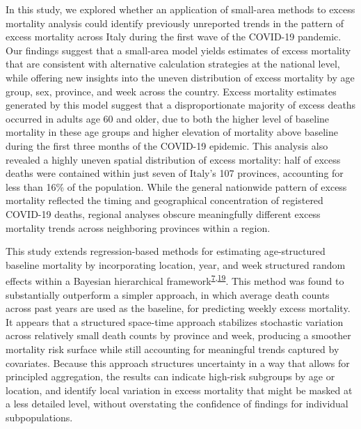 \documentclass[
]{article}
\begin{document}
In this study, we explored whether an application of small-area methods to excess mortality analysis could identify previously unreported trends in the pattern of excess mortality across Italy during the first wave of the COVID-19 pandemic. Our findings suggest that a small-area model yields estimates of excess mortality that are consistent with alternative calculation strategies at the national level, while offering new insights into the uneven distribution of excess mortality by age group, sex, province, and week across the country. Excess mortality estimates generated by this model suggest that a disproportionate majority of excess deaths occurred in adults age 60 and older, due to both the higher level of baseline mortality in these age groups and higher elevation of mortality above baseline during the first three months of the COVID-19 epidemic. This analysis also revealed a highly uneven spatial distribution of excess mortality: half of excess deaths were contained within just seven of Italy's 107 provinces, accounting for less than 16\% of the population. While the general nationwide pattern of excess mortality reflected the timing and geographical concentration of registered COVID-19 deaths, regional analyses obscure meaningfully different excess mortality trends across neighboring provinces within a region.

This study extends regression-based methods for estimating age-structured baseline mortality by incorporating location, year, and week structured random effects within a Bayesian hierarchical framework\textsuperscript{\protect\hyperlink{ref-Serfling1963}{7},\protect\hyperlink{ref-Ederer1961}{19}}⁠. This method was found to substantially outperform a simpler approach, in which average death counts across past years are used as the baseline, for predicting weekly excess mortality. It appears that a structured space-time approach stabilizes stochastic variation across relatively small death counts by province and week, producing a smoother mortality risk surface while still accounting for meaningful trends captured by covariates. Because this approach structures uncertainty in a way that allows for principled aggregation, the results can indicate high-risk subgroups by age or location, and identify local variation in excess mortality that might be masked at a less detailed level, without overstating the confidence of findings for individual subpopulations.
\end{document}
